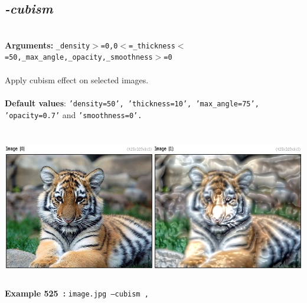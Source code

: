 \documentclass[a4paper,11pt,twoside]{book}
\begin{document}
\subsection{\emph{-cubism} }\vspace*{-0.5em}
~\\\textbf{Arguments: } 
{\small \texttt{\_density$>$=0,0$<$=\_thickness$<$=50,\_max\_angle,\_opacity,\_smoothness$>$=0}}\\~\\
Apply cubism effect on selected images.
~\\~\\\textbf{Default values}: {\small \texttt{'density=50', 'thickness=10', 'max\_angle=75', 'opacity=0.7'} and \texttt{'smoothness=0'.}}
\begin{center}\includegraphics[keepaspectratio=true,height=7cm,width=\textwidth]{img/gmic_def525.jpg}\\
{\footnotesize \textbf{Example 525~:} \texttt{image.jpg --cubism ,}}
\end{center}
\end{document}
